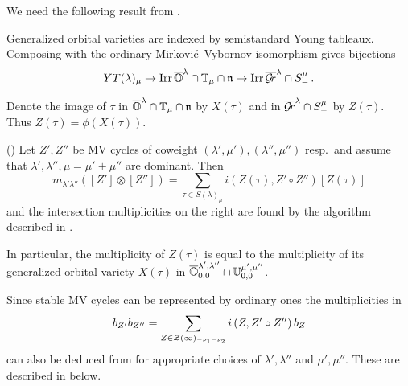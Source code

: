\documentclass[draft]{article}
\begin{document}
We need the following result from \cite{dthesis}.
\begin{proposition}
    Generalized orbital varieties are indexed by semistandard Young tableaux. Composing with the ordinary Mirkovi\'c--Vybornov isomorphism gives bijections 
    \[
        YT(\lambda)_\mu \to \operatorname{Irr} \overline{\mathbb O}^\lambda\cap\mathbb T_\mu\cap\mathfrak n \to \operatorname{Irr} \overline{\mathcal{G}\!r}^\lambda\cap S^\mu_-\,. 
    \]
\end{proposition}
% 
Denote the image of $\tau$ in $\overline{\mathbb O}^\lambda\cap\mathbb T_\mu\cap\mathfrak n$ by $X(\tau)$ and in $\overline{\mathcal{G}\!r}^\lambda\cap S^\mu_-$ by $Z(\tau)$. Thus $Z(\tau) = \phi(X(\tau))$. 
% 
\begin{proposition}(\cite{baumann2019mirkovic})
    Let $Z',Z''$  be MV cycles of coweight $(\lambda',\mu'),(\lambda'',\mu'')$ resp.\ and assume that $\lambda',\lambda'',\mu = \mu' + \mu''$ are dominant. 
    Then 
    \begin{equation}
        \label{eq:tabmult}
        m_{\lambda'\lambda''} ([Z']\otimes[Z'']) 
        = 
        \sum_{\tau\in S(\lambda)_\mu}
        i\left(
            Z(\tau), Z'\circ Z''
        \right) [Z(\tau)]
    \end{equation}
    and the intersection multiplicities on the right are found by the algorithm described in . 
    
    
    In particular, the multiplicity of $Z(\tau)$
    is equal to the multiplicity of its generalized orbital variety $X(\tau)$ 
    in $ \overline{\mathbb O}^{\lambda',\lambda''}_{0,0}\cap\mathbb U^{\mu',\mu''}_{0,0} $. 

    Since stable MV cycles can be represented by ordinary ones the multiplicities in 
    $$
    b_{Z'}b_{Z''} = \sum_{Z\in\mathcal Z(\infty)_{-\nu_1 - \nu_2}} i \left(
        Z, Z' \circ Z''
    \right) b_Z 
    $$
    can also be deduced from  for appropriate choices of $\lambda',\lambda''$ and $\mu',\mu''$. These are described in  below.
\end{proposition}
\end{document}
